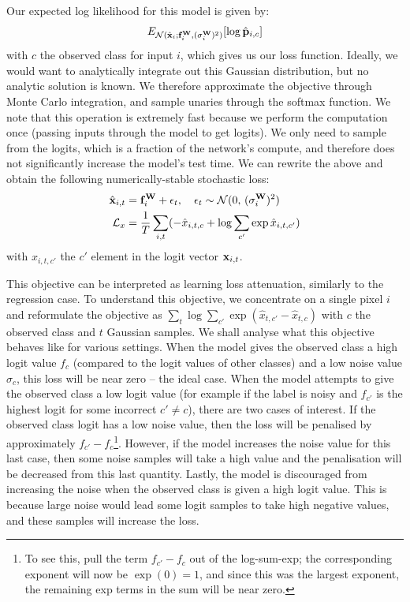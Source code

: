 Our expected log likelihood for this model is given by:
\begin{equation}
E_{\mathcal{N}(\hat{\mathbf{x}}_i; \mathbf{f}^{\mathbf{W}}_i, (\sigma_i^{\mathbf{W}})^2)}[\log \hat{\mathbf{p}}_{i,c}]
\end{equation}
with $c$ the observed class for input $i$,
which gives us our loss function.
Ideally, we would want to analytically integrate out this Gaussian distribution, but no analytic solution is known.
We therefore approximate the objective through Monte Carlo integration, and sample unaries through the softmax function.
We note that this operation is extremely fast because we perform the computation once (passing inputs through the model to get logits). We only need to sample from the logits, which is a fraction of the network's compute, and therefore does not significantly increase the model's test time. 
We can rewrite the above and obtain the following numerically-stable stochastic loss:
\begin{equation}
\begin{split}
\hat{\mathbf{x}}_{i,t} &= \mathbf{f}^{\mathbf{W}}_i + \epsilon_t, \quad \epsilon_t \sim \mathcal{N}(0,\,(\sigma_i^{\mathbf{W}})^2)
\\
\mathcal{L}_x &= \frac{1}{T} \sum_{i,t} (- \hat{x}_{i,t,c} + \log \sum_{c'} \exp \hat{x}_{i,t,c'})
\end{split}
\label{eqn:aleatoric_classification_loss}
\end{equation}
with $x_{i,t,c'}$ the $c'$ element in the logit vector $\mathbf{x}_{i,t}$. 

This objective can be interpreted as learning loss attenuation, similarly to the regression case.
To understand this objective, we concentrate on a single pixel $i$ and reformulate the objective as $\sum_{t} \log \sum_{c'} \exp (\hat{x}_{t,c'} - \hat{x}_{t,c})$ with $c$ the observed class and $t$ Gaussian samples. We shall analyse what this objective behaves like for various settings.
When the model gives the observed class a high logit value $f_{c}$ (compared to the logit values of other classes) and a low noise value $\sigma_{c}$, this loss will be near zero -- the ideal case. When the model attempts to give the observed class a low logit value (for example if the label is noisy and $f_{c'}$ is the highest logit for some incorrect $c' \neq c$), there are two cases of interest. If the observed class logit has a low noise value, then the loss will be penalised by approximately $f_{c'} - f_{c}$\footnote{To see this, pull the term $f_{c'} - f_{c}$ out of the log-sum-exp; the corresponding exponent will now be $\exp(0)=1$, and since this was the largest exponent, the remaining exp terms in the sum will be near zero.}. However, if the model increases the noise value for this last case, then some noise samples will take a high value and the penalisation will be decreased from this last quantity. Lastly, the model is discouraged from increasing the noise when the observed class is given a high logit value. This is because large noise would lead some logit samples to take high negative values, and these samples will increase the loss.



